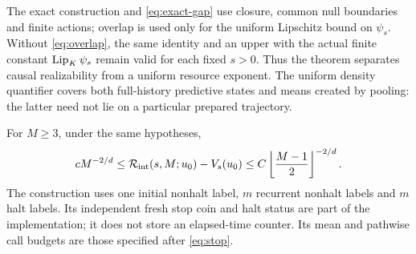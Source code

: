 The exact construction and \eqref{eq:exact-gap} use closure, common null boundaries and finite actions; overlap is used only for the uniform Lipschitz bound on $\psi_s$. Without \eqref{eq:overlap}, the same identity and an upper with the actual finite constant $\operatorname{Lip}_K\psi_s$ remain valid for each fixed $s>0$. Thus the theorem separates causal realizability from a uniform resource exponent. The uniform density quantifier covers both full-history predictive states and means created by pooling: the latter need not lie on a particular prepared trajectory.

\begin{corollary}\label{cor:internal}
For $M\ge3$, under the same hypotheses,
\[
 cM^{-2/d}\le\mathcal R_{\rm int}(s,M;u_0)-V_s(u_0)
 \le C\left\lfloor\frac{M-1}{2}\right\rfloor^{-2/d}.
\]
The construction uses one initial nonhalt label, $m$ recurrent nonhalt labels and $m$ halt labels. Its independent fresh stop coin and halt status are part of the implementation; it does not store an elapsed-time counter. Its mean and pathwise call budgets are those specified after \eqref{eq:stop}.
\end{corollary}
